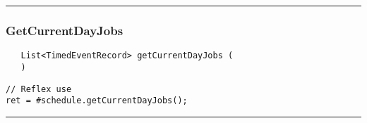 \rule{15cm}{2pt}
\subsubsection{GetCurrentDayJobs}
\label{Api:GetCurrentDayJobs}
\begin{verbatim}
   List<TimedEventRecord> getCurrentDayJobs (
   )
\end{verbatim}
\begin{lstlisting}[language=reflex]
// Reflex use
ret = #schedule.getCurrentDayJobs();
\end{lstlisting}



\rule{15cm}{2pt}
